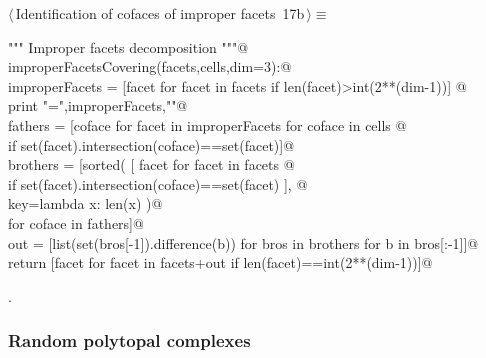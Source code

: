 \documentclass[11pt,oneside]{article}	%
\begin{document}
\begin{flushleft} \small \label{scrap26}
\protect{}$\langle\,$Identification of cofaces of improper facets\nobreak\ {\footnotesize 17b}$\,\rangle\equiv$
\vspace{-1ex}
\begin{list}{}{} \item
\mbox{}\verb@""" Improper facets decomposition """@\\
\mbox{}\verb@def improperFacetsCovering(facets,cells,dim=3):@\\
\mbox{}\verb@   improperFacets = [facet for facet in facets if len(facet)>int(2**(dim-1))] @\\
\mbox{}\verb@   print "\nimproperFacets =",improperFacets,"\n"@\\
\mbox{}\verb@   fathers = [coface for facet in improperFacets for coface in cells @\\
\mbox{}\verb@            if set(facet).intersection(coface)==set(facet)]@\\
\mbox{}\verb@   brothers = [sorted( [ facet for facet in facets @\\
\mbox{}\verb@               if set(facet).intersection(coface)==set(facet) ], @\\
\mbox{}\verb@               key=lambda x: len(x) )@\\
\mbox{}\verb@                  for coface in fathers]@\\
\mbox{}\verb@   out = [list(set(bros[-1]).difference(b)) for bros in brothers for b in bros[:-1]]@\\
\mbox{}\verb@   return [facet for facet in facets+out if len(facet)==int(2**(dim-1))]@\\
\mbox{}\verb@@{\NWsep}
\end{list}
\vspace{-1ex}
\footnotesize\addtolength{\baselineskip}{-1ex}
\begin{list}{}{\setlength{\itemsep}{-\parsep}\setlength{\itemindent}{-\leftmargin}}
\item {\NWtxtMacroNoRef}.
\end{list}
\end{flushleft}

\subsubsection{Random polytopal complexes}
\end{document}
